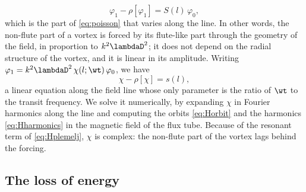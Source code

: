 \begin{equation}
\varphi_1 - \rho[\varphi_1] = S(l)\,\varphi_0 ,
\label{eq:Hfield}
\end{equation}
which is the part of \cref{eq:poisson} that varies along the line. In other words, the non-flute part of a vortex is forced by its flute-like part through the geometry of the field, in proportion to \(k^2\lambdaD^2\); it does not depend on the radial structure of the vortex, and it is linear in its amplitude. Writing \(\varphi_1 = k^2\lambdaD^2\,\chi(l;\wt)\,\varphi_0\), we have
\begin{equation}
\chi - \rho[\chi] = s(l),
\label{eq:Hchi}
\end{equation}
a linear equation along the field line whose only parameter is the ratio of \(\wt\) to the transit frequency. We solve it numerically, by expanding \(\chi\) in Fourier harmonics along the line and computing the orbits \cref{eq:Horbit} and the harmonics \cref{eq:Hharmonics} in the magnetic field of the flux tube. Because of the resonant term of \cref{eq:Hplemelj}, \(\chi\) is complex: the non-flute part of the vortex lags behind the forcing.

\subsection{The loss of energy}

